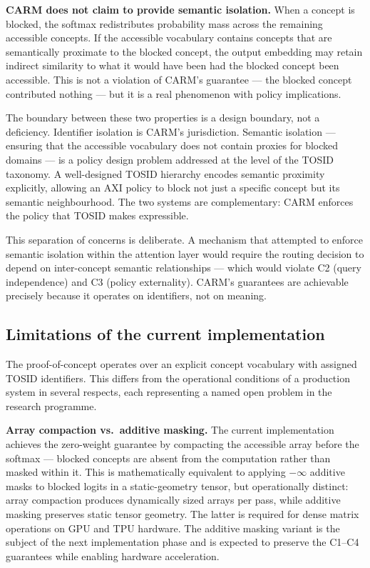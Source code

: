\documentclass[11pt,a4paper]{article}
\theoremstyle{definition}
\begin{document}
\textbf{CARM does not claim to provide semantic isolation.} When a concept
is blocked, the softmax redistributes probability mass across the remaining
accessible concepts. If the accessible vocabulary contains concepts that are
semantically proximate to the blocked concept, the output embedding may
retain indirect similarity to what it would have been had the blocked concept
been accessible. This is not a violation of CARM's guarantee --- the blocked
concept contributed nothing --- but it is a real phenomenon with policy
implications.

The boundary between these two properties is a design boundary, not a
deficiency. Identifier isolation is CARM's jurisdiction. Semantic isolation
--- ensuring that the accessible vocabulary does not contain proxies for
blocked domains --- is a policy design problem addressed at the level of the
TOSID taxonomy. A well-designed TOSID hierarchy encodes semantic proximity
explicitly, allowing an AXI policy to block not just a specific concept but
its semantic neighbourhood. The two systems are complementary: CARM enforces
the policy that TOSID makes expressible.

This separation of concerns is deliberate. A mechanism that attempted to
enforce semantic isolation within the attention layer would require the
routing decision to depend on inter-concept semantic relationships --- which
would violate C2 (query independence) and C3 (policy externality). CARM's
guarantees are achievable precisely because it operates on identifiers, not
on meaning.

\subsection{Limitations of the current implementation}
\label{sec:limitations}

The proof-of-concept operates over an explicit concept vocabulary with
assigned TOSID identifiers. This differs from the operational conditions of
a production system in several respects, each representing a named open
problem in the research programme.

\textbf{Array compaction vs.\ additive masking.} The current implementation
achieves the zero-weight guarantee by compacting the accessible array before
the softmax --- blocked concepts are absent from the computation rather than
masked within it. This is mathematically equivalent to applying $-\infty$
additive masks to blocked logits in a static-geometry tensor, but operationally
distinct: array compaction produces dynamically sized arrays per pass, while
additive masking preserves static tensor geometry. The latter is required for
dense matrix operations on GPU and TPU hardware. The additive masking variant
is the subject of the next implementation phase and is expected to preserve
the C1--C4 guarantees while enabling hardware acceleration.
\end{document}

